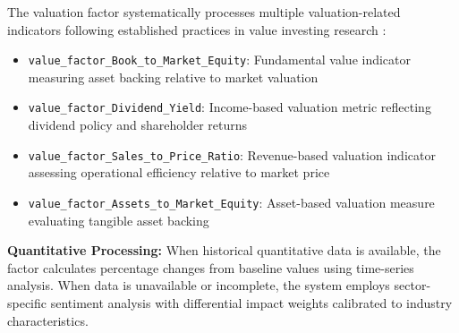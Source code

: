 \documentclass[3p,times,procedia]{elsarticle}
\begin{document}
The valuation factor systematically processes multiple valuation-related indicators following established practices in value investing research \cite{Graham2003}:

\begin{itemize}
    \item \texttt{value\_factor\_Book\_to\_Market\_Equity}: Fundamental value indicator measuring asset backing relative to market valuation
    \item \texttt{value\_factor\_Dividend\_Yield}: Income-based valuation metric reflecting dividend policy and shareholder returns
    \item \texttt{value\_factor\_Sales\_to\_Price\_Ratio}: Revenue-based valuation indicator assessing operational efficiency relative to market price
    \item \texttt{value\_factor\_Assets\_to\_Market\_Equity}: Asset-based valuation measure evaluating tangible asset backing
\end{itemize}

\textbf{Quantitative Processing:} When historical quantitative data is available, the factor calculates percentage changes from baseline values using time-series analysis. When data is unavailable or incomplete, the system employs sector-specific sentiment analysis with differential impact weights calibrated to industry characteristics.
\end{document}
